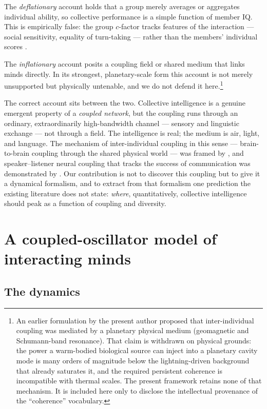 \documentclass[11pt]{article}
\begin{document}
The \emph{deflationary} account holds that a group merely averages or aggregates individual ability, so collective performance is a simple function of member IQ. This is empirically false: the group $c$-factor tracks features of the interaction --- social sensitivity, equality of turn-taking --- rather than the members' individual scores \citep{woolley2010evidence}.

The \emph{inflationary} account posits a coupling field or shared medium that links minds directly. In its strongest, planetary-scale form this account is not merely unsupported but physically untenable, and we do not defend it here.\footnote{An earlier formulation by the present author proposed that inter-individual coupling was mediated by a planetary physical medium (geomagnetic and Schumann-band resonance). That claim is withdrawn on physical grounds: the power a warm-bodied biological source can inject into a planetary cavity mode is many orders of magnitude below the lightning-driven background that already saturates it, and the required persistent coherence is incompatible with thermal scales. The present framework retains none of that mechanism. It is included here only to disclose the intellectual provenance of the ``coherence'' vocabulary.}

The correct account sits between the two. Collective intelligence is a genuine emergent property of a \emph{coupled network}, but the coupling runs through an ordinary, extraordinarily high-bandwidth channel --- sensory and linguistic exchange --- not through a field. The intelligence is real; the medium is air, light, and language. The mechanism of inter-individual coupling in this sense --- brain-to-brain coupling through the shared physical world --- was framed by \citet{hasson2012brain}, and speaker--listener neural coupling that tracks the success of communication was demonstrated by \citet{stephens2010speaker}. Our contribution is not to discover this coupling but to give it a dynamical formalism, and to extract from that formalism one prediction the existing literature does not state: \emph{where}, quantitatively, collective intelligence should peak as a function of coupling and diversity.

\section{A coupled-oscillator model of interacting minds}

\subsection{The dynamics}
\end{document}
